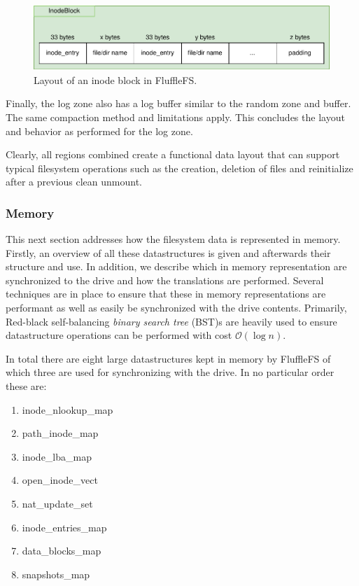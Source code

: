 \begin{figure}[h!]
    \centering
	\includegraphics[width=1\textwidth]{resources/images/fluffle-inodeblock.pdf}
	\caption{Layout of an inode block in FluffleFS.}
    \label{figure:fluffleinodeblock}
\end{figure}

Finally, the log zone also has a log buffer similar to the random zone and
buffer. The same compaction method and limitations apply. This concludes the
layout and behavior as performed for the log zone.

Clearly, all regions combined create a functional data layout that can support
typical filesystem operations such as the creation, deletion of files and
reinitialize after a previous clean unmount.

\subsubsection{Memory}

This next section addresses how the filesystem data is represented in memory.
Firstly, an overview of all these datastructures is given and afterwards their
structure and use. In addition, we describe which in memory representation are
synchronized to the drive and how the translations are performed. Several
techniques are in place to ensure that these in memory representations are
performant as well as easily be synchronized with the drive contents. Primarily,
Red-black self-balancing \textit{binary search tree} (BST)s
\cite{Bayer2004SymmetricBB} are heavily used to ensure datastructure operations
can be performed with cost $\mathcal{O}(\log n)$.

In total there are eight large datastructures kept in memory by FluffleFS of
which three are used for synchronizing with the drive. In no particular order
these are:

\begin{enumerate}
    \item inode\_nlookup\_map
    \item path\_inode\_map
    \item inode\_lba\_map
    \item open\_inode\_vect
    \item nat\_update\_set
    \item inode\_entries\_map
    \item data\_blocks\_map
    \item snapshots\_map
\end{enumerate}

